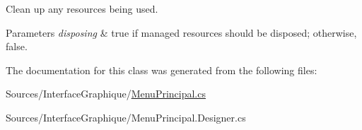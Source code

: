 Clean up any resources being used. 


\begin{DoxyParams}{Parameters}
{\em disposing} & true if managed resources should be disposed; otherwise, false.\\
\hline
\end{DoxyParams}


The documentation for this class was generated from the following files\+:\begin{DoxyCompactItemize}
\item 
Sources/\+Interface\+Graphique/\hyperlink{_menu_principal_8cs}{Menu\+Principal.\+cs}\item 
Sources/\+Interface\+Graphique/Menu\+Principal.\+Designer.\+cs\end{DoxyCompactItemize}
